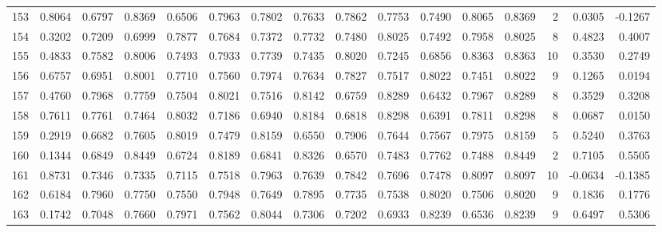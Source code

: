 \begin{tabular}{lrrrrrrrrrrrrrrr}
153 &      0.8064 &  0.6797 &  0.8369 &  0.6506 &  0.7963 &  0.7802 &  0.7633 &  0.7862 &  0.7753 &  0.7490 &   0.8065 &     0.8369 &      2 &                    0.0305 &                    -0.1267 \\
154 &      0.3202 &  0.7209 &  0.6999 &  0.7877 &  0.7684 &  0.7372 &  0.7732 &  0.7480 &  0.8025 &  0.7492 &   0.7958 &     0.8025 &      8 &                    0.4823 &                     0.4007 \\
155 &      0.4833 &  0.7582 &  0.8006 &  0.7493 &  0.7933 &  0.7739 &  0.7435 &  0.8020 &  0.7245 &  0.6856 &   0.8363 &     0.8363 &     10 &                    0.3530 &                     0.2749 \\
156 &      0.6757 &  0.6951 &  0.8001 &  0.7710 &  0.7560 &  0.7974 &  0.7634 &  0.7827 &  0.7517 &  0.8022 &   0.7451 &     0.8022 &      9 &                    0.1265 &                     0.0194 \\
157 &      0.4760 &  0.7968 &  0.7759 &  0.7504 &  0.8021 &  0.7516 &  0.8142 &  0.6759 &  0.8289 &  0.6432 &   0.7967 &     0.8289 &      8 &                    0.3529 &                     0.3208 \\
158 &      0.7611 &  0.7761 &  0.7464 &  0.8032 &  0.7186 &  0.6940 &  0.8184 &  0.6818 &  0.8298 &  0.6391 &   0.7811 &     0.8298 &      8 &                    0.0687 &                     0.0150 \\
159 &      0.2919 &  0.6682 &  0.7605 &  0.8019 &  0.7479 &  0.8159 &  0.6550 &  0.7906 &  0.7644 &  0.7567 &   0.7975 &     0.8159 &      5 &                    0.5240 &                     0.3763 \\
160 &      0.1344 &  0.6849 &  0.8449 &  0.6724 &  0.8189 &  0.6841 &  0.8326 &  0.6570 &  0.7483 &  0.7762 &   0.7488 &     0.8449 &      2 &                    0.7105 &                     0.5505 \\
161 &      0.8731 &  0.7346 &  0.7335 &  0.7115 &  0.7518 &  0.7963 &  0.7639 &  0.7842 &  0.7696 &  0.7478 &   0.8097 &     0.8097 &     10 &                   -0.0634 &                    -0.1385 \\
162 &      0.6184 &  0.7960 &  0.7750 &  0.7550 &  0.7948 &  0.7649 &  0.7895 &  0.7735 &  0.7538 &  0.8020 &   0.7506 &     0.8020 &      9 &                    0.1836 &                     0.1776 \\
163 &      0.1742 &  0.7048 &  0.7660 &  0.7971 &  0.7562 &  0.8044 &  0.7306 &  0.7202 &  0.6933 &  0.8239 &   0.6536 &     0.8239 &      9 &                    0.6497 &                     0.5306 \\

\end{tabular}
